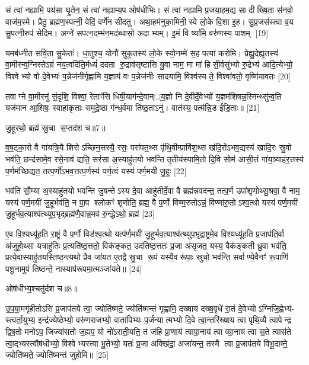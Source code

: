 सं त्वा॑ नह्यामि॒ पय॑सा घृ॒तेन॒ सं त्वा॑ नह्याम्य॒प ओष॑धीभिः। सं त्वा॑ नह्यामि प्र॒जया॒हम॒द्य सा दीख्षि॒ता स॑नवो॒ वाज॑म॒स्मे। प्रैतु॒ ब्रह्म॑ण॒स्पत्नी॒ वेदिं॒ वर्णे॑न सीदतु। अथा॒हम॑नुका॒मिनी॒ स्वे लो॒के वि॒शा इ॒ह। सु॒प्र॒जस॑स्त्वा व॒य सु॒पत्नी॒रुप॑ सेदिम। अग्ने॑ सपत्न॒दम्भ॑न॒मद॑ब्धासो॒ अदाभ्यम्। इ॒मं वि ष्या॑मि॒ वरु॑णस्य॒ पाशम् [19]

यमब॑ध्नीत सवि॒ता सु॒केतः॑। धा॒तुश्च॒ योनौ॑ सुकृ॒तस्य॑ लो॒के स्यो॒नम्मे॑ स॒ह पत्या॑ करोमि। प्रेह्यु॒देह्यृ॒तस्य॑ वा॒मीरन्व॒ग्निस्तेऽग्रं॑ नय॒त्वदि॑ति॒र्मध्यं॑ ददता रु॒द्राव॑सृष्टासि यु॒वा नाम॒ मा मा॑ हिसी॒र्वसु॑भ्यो रु॒द्रेभ्य॑ आदि॒त्येभ्यो॒ विश्वेभ्यो वो दे॒वेभ्यः॑ प॒न्नेज॑नीर्गृह्णामि य॒ज्ञाय॑ वः प॒न्नेज॑नीः सादयामि॒ विश्व॑स्य ते॒ विश्वा॑वतो॒ वृष्णि॑यावतः [20]

तवाग्ने वा॒मीरनु॑ सं॒दृशि॒ विश्वा॒ रेताꣳ॑सि धिषी॒याग॑न्दे॒वान््य॒ज्ञो नि दे॒वीर्दे॒वेभ्यो॑ य॒ज्ञम॑शिषन्न॒स्मिन्थ्सु॑न्व॒ति यज॑मान आ॒शिषः॒ स्वाहा॑कृताः समुद्रे॒ष्ठा ग॑न्ध॒र्वमा ति॑ष्ठ॒ताऽनु॑। वात॑स्य॒ पत्म॑न्नि॒ड ई॑डि॒ताः॥ [21]

{\scriptsize {जु॒हूरथो॒ ब्रह्म॑ स्रु॒चा स॒प्तद॑श च॥7॥}}

व॒ष॒ट्का॒रो वै गा॑यत्रि॒यै शिरोऽच्छिन॒त्तस्यै॒ रसः॒ परा॑पत॒थ्स पृ॑थि॒वीम्प्रावि॑श॒थ्स ख॑दि॒रो॑ऽभव॒द्यस्य॑ खादि॒रः स्रु॒वो भव॑ति॒ छन्द॑सामे॒व रसे॒नाव॑ द्यति॒ सर॑सा अ॒स्याहु॑तयो भवन्ति तृ॒तीय॑स्यामि॒तो दि॒वि सोम॑ आसी॒त्तं गा॑य॒त्र्याह॑र॒त्तस्य॑ प॒र्णम॑च्छिद्यत॒ तत्प॒र्णो॑ऽभव॒त्तत्प॒र्णस्य॑ पर्ण॒त्वं यस्य॑ पर्ण॒मयी॑ जु॒हूः [22]

भव॑ति सौ॒म्या अ॒स्याहु॑तयो भवन्ति जु॒षन्तेऽस्य दे॒वा आहु॑तीर्दे॒वा वै ब्रह्म॑न्नवदन्त॒ तत्प॒र्ण उपा॑शृणोथ्सु॒श्रवा॒ वै नाम॒ यस्य॑ पर्ण॒मयी॑ जु॒हूर्भव॑ति॒ न पा॒प श्लोकꣳ॑ शृणोति॒ ब्रह्म॒ वै प॒र्णो विण्म॒रुतोऽन्नं॒ विण्मा॑रु॒तोऽश्व॒त्थो यस्य॑ पर्ण॒मयी॑ जु॒हूर्भव॒त्याश्व॑त्थ्युप॒भृद्ब्रह्म॑णै॒वान्न॒मव॑ रु॒न्द्धेऽथो॒ ब्रह्म॑ [23]

ए॒व वि॒श्यध्यू॑हति रा॒ष्ट्रं वै प॒र्णो विड॑श्व॒त्थो यत्प॑र्ण॒मयी॑ जु॒हूर्भव॒त्याश्व॑त्थ्युप॒भृद्रा॒ष्ट्रमे॒व वि॒श्यध्यू॑हति प्र॒जाप॑ति॒र्वा अ॑जुहो॒थ्सा यत्राहु॑तिः प्र॒त्यति॑ष्ठ॒त्ततो॒ विक॑ङ्कत॒ उद॑तिष्ठ॒त्ततः॑ प्र॒जा अ॑सृजत॒ यस्य॒ वैक॑ङ्कती ध्रु॒वा भव॑ति॒ प्रत्ये॒वास्याहु॑तयस्तिष्ठ॒न्त्यथो॒ प्रैव जा॑यत ए॒तद्वै स्रु॒चा रू॒पं यस्यै॒वरू॑पाः॒ स्रुचो॒ भव॑न्ति॒ सर्वाण्ये॒वैनꣳ॑ रू॒पाणि॑ पशू॒नामुप॑ तिष्ठन्ते॒ नास्याप॑रूपमा॒त्मञ्जा॑यते॥ [24]

{\scriptsize {ओष॑धीभ्य॒श्चतु॑र्दश च॥8॥}}

उ॒प॒या॒मगृ॑हीतोऽसि प्र॒जाप॑तये त्वा॒ ज्योति॑ष्मते॒ ज्योति॑ष्मन्तं गृह्णामि॒ दख्षा॑य दख्ष॒वृधे॑ रा॒तं दे॒वेभ्योऽग्निजि॒ह्वेभ्य॑- स्त्वर्ता॒युभ्य॒ इन्द्र॑ज्येष्ठेभ्यो॒ वरु॑णराजभ्यो॒ वाता॑पिभ्यः प॒र्जन्यात्मभ्यो दि॒वे त्वा॒न्तरि॑ख्षाय त्वा पृथि॒व्यै त्वापेन्द्र द्विष॒तो मनोऽप॒ जिज्या॑सतो ज॒ह्यप॒ यो नो॑ऽराती॒यति॒ तं ज॑हि प्रा॒णाय॑ त्वापा॒नाय॑ त्वा व्या॒नाय॑ त्वा स॒ते त्वास॑ते त्वा॒द्भ्यस्त्वौष॑धीभ्यो॒ विश्वेभ्यस्त्वा भू॒तेभ्यो॒ यतः॑ प्र॒जा अक्खि॑द्रा॒ अजा॑यन्त॒ तस्मै त्वा प्र॒जाप॑तये विभू॒दाव्ने॒ ज्योति॑ष्मते॒ ज्योति॑ष्मन्तं जुहोमि॥ [25]

